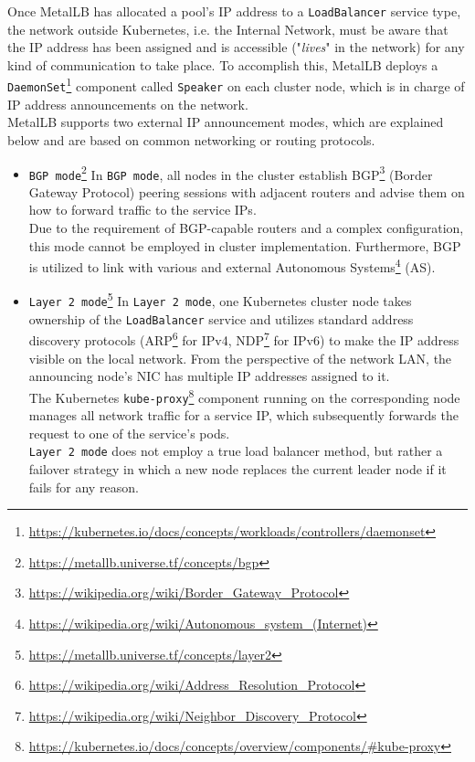 Once MetalLB has allocated a pool's IP address to a \texttt{LoadBalancer}
service type, the network outside Kubernetes, i.e. the Internal Network, must be
aware that the IP address has been assigned and is accessible ("\textit{lives}"
in the network) for any kind of communication to take place. To accomplish this,
MetalLB deploys a \texttt{DaemonSet}\footnote{\url{https://kubernetes.io/docs/concepts/workloads/controllers/daemonset}}
component called \texttt{Speaker} on each cluster node, which is in charge of IP
address announcements on the network\cite{metallb_installation}. \\ %
MetalLB supports two external IP announcement modes, which are explained below
and are based on common networking or routing protocols\cite{metallb_external_announcement}.
\begin{itemize}
  \item \texttt{BGP mode}\footnote{\url{https://metallb.universe.tf/concepts/bgp}}
    \newline
    In \texttt{BGP mode}, all nodes in the cluster establish BGP\footnote{\url{https://wikipedia.org/wiki/Border_Gateway_Protocol}}
    (Border Gateway Protocol) peering sessions with adjacent routers and advise
    them on how to forward traffic to the service IPs\cite{metallb_bgp}. \\ %
    Due to the requirement of BGP-capable routers and a complex configuration,
    this mode cannot be employed in cluster implementation. Furthermore, BGP is
    utilized to link with various and external Autonomous Systems\footnote{\url{https://wikipedia.org/wiki/Autonomous_system_(Internet)}}
    (AS).

  \item \texttt{Layer 2 mode}\footnote{\url{https://metallb.universe.tf/concepts/layer2}}
    \newline
    In \texttt{Layer 2 mode}, one Kubernetes cluster node takes ownership of the
    \texttt{LoadBalancer} service and utilizes standard address discovery protocols
    (ARP\footnote{\url{https://wikipedia.org/wiki/Address_Resolution_Protocol}}
    for IPv4, NDP\footnote{\url{https://wikipedia.org/wiki/Neighbor_Discovery_Protocol}}
    for IPv6) to make the IP address visible on the local network. From the perspective
    of the network LAN, the announcing node's NIC has multiple IP addresses
    assigned to it. \\ %
    The Kubernetes \texttt{kube-proxy}\footnote{\url{https://kubernetes.io/docs/concepts/overview/components/\#kube-proxy}}
    component running on the corresponding node manages all network traffic for a
    service IP, which subsequently forwards the request to one of the service's
    pods. \\ %
    \texttt{Layer 2 mode} does not employ a true load balancer method, but
    rather a failover strategy in which a new node replaces the current leader
    node if it fails for any reason.\cite{metallb_layer2}
\end{itemize}
